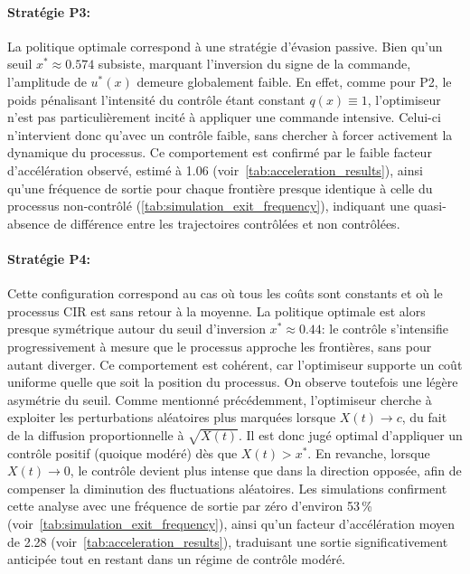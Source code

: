 \paragraph{Stratégie P3:} La politique optimale correspond à une stratégie d'évasion passive. Bien qu'un seuil \(x^*\approx0.574\) subsiste, marquant l'inversion du signe de la commande, l'amplitude de \(u^*(x)\) demeure globalement faible. En effet, comme pour P2,  le poids pénalisant l'intensité du contrôle étant constant \(q(x) \equiv 1\), l'optimiseur n'est pas particulièrement incité à appliquer une commande intensive. Celui-ci n'intervient donc qu'avec un contrôle faible, sans chercher à forcer activement la dynamique du processus. Ce comportement est confirmé par le faible facteur d'accélération observé, estimé à 1.06 (voir~\ref{tab:acceleration_results}), ainsi qu'une fréquence de sortie pour chaque frontière presque identique à celle du processus non-contrôlé (\ref{tab:simulation_exit_frequency}), indiquant une quasi-absence de différence entre les trajectoires contrôlées et non contrôlées.
\paragraph{Stratégie P4:} Cette configuration correspond au cas où tous les coûts sont constants et où le processus \acs{CIR} est sans retour à la moyenne. La politique optimale est alors presque symétrique autour du seuil d'inversion $x^* \approx 0.44$: le contrôle s'intensifie progressivement à mesure que le processus approche les frontières, sans pour autant diverger. Ce comportement est cohérent, car l'optimiseur supporte un coût uniforme quelle que soit la position du processus. On observe toutefois une légère asymétrie du seuil. Comme mentionné précédemment, l'optimiseur cherche à exploiter les perturbations aléatoires plus marquées lorsque $X(t) \to c$, du fait de la diffusion proportionnelle à $\sqrt{X(t)}$. Il est donc jugé optimal d'appliquer un contrôle positif (quoique modéré) dès que $X(t) > x^*$. En revanche, lorsque $X(t) \to 0$, le contrôle devient plus intense que dans la direction opposée, afin de compenser la diminution des fluctuations aléatoires. Les simulations confirment cette analyse avec une fréquence de sortie par zéro d'environ 53\,\% (voir~\ref{tab:simulation_exit_frequency}), ainsi qu'un facteur d'accélération moyen de 2.28 (voir~\ref{tab:acceleration_results}), traduisant une sortie significativement anticipée tout en restant dans un régime de contrôle modéré.
